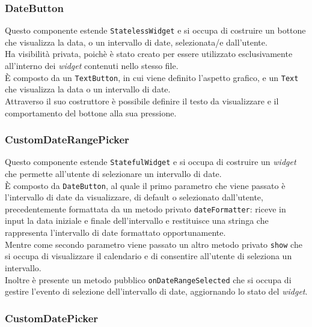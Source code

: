 \subsubsection*{DateButton}
\label{subsubsec:date-button}

Questo componente estende \lstinline{StatelessWidget} e si occupa di costruire un bottone che visualizza la data, o un intervallo di date, selezionata/e dall'utente.\\
Ha visibilità privata, poichè è stato creato per essere utilizzato esclusivamente all'interno dei \emph{widget} contenuti nello stesso file.\\
È composto da un \lstinline{TextButton}\cite{site:text-button}, in cui viene definito l'aspetto grafico, e un \lstinline{Text} che visualizza la data o un intervallo di date. \\
Attraverso il suo costruttore è possibile definire il testo da visualizzare e il comportamento del bottone alla sua pressione.\\

\subsubsection*{CustomDateRangePicker}
\label{subsubsec:custom-date-range-picker}

Questo componente estende \lstinline{StatefulWidget} e si occupa di costruire un \emph{widget} che permette all'utente di selezionare un intervallo di date.\\
È composto da \lstinline{DateButton}, al quale il primo parametro che viene passato è l'intervallo di date da visualizzare, di default o selezionato dall'utente, precedentemente formattata da un metodo privato \lstinline{dateFormatter}: riceve in input la data iniziale e finale dell'intervallo e restituisce una stringa che rappresenta l'intervallo di date formattato opportunamente.\\
Mentre come secondo parametro viene passato un altro metodo privato \lstinline{show} che si occupa di visualizzare il calendario e di consentire all'utente di seleziona un intervallo. \\
Inoltre è presente un metodo pubblico \lstinline{onDateRangeSelected} che si occupa di gestire l'evento di selezione dell'intervallo di date, aggiornando lo stato del \emph{widget}. \\

\subsubsection*{CustomDatePicker}
\label{subsubsec:custom-date-picker}

